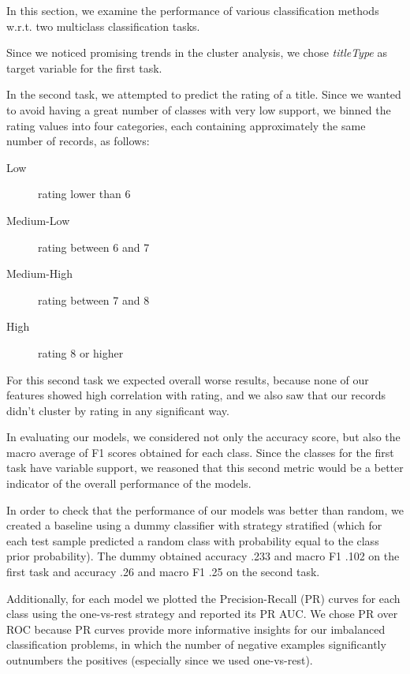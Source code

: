 In this section, we examine the performance of various classification methods w.r.t. two multiclass classification tasks.

Since we noticed promising trends in the cluster analysis, we chose \emph{titleType} as target variable for the first task.

In the second task, we attempted to predict the rating of a title.
Since we wanted to avoid having a great number of classes with very low support, we binned the rating values into four categories, each containing approximately the same number of records, as follows:
\begin{description}
    \item[Low] rating lower than 6
    \item[Medium-Low] rating between 6 and 7
    \item[Medium-High]  rating between 7 and 8
    \item[High] rating 8 or higher
\end{description}

For this second task we expected overall worse results, because none of our features showed high correlation with rating, and we also saw that our records didn't cluster by rating in any significant way.

In evaluating our models, we considered not only the accuracy score, but also the macro average of F1 scores obtained for each class.
Since the classes for the first task have variable support, we reasoned that this second metric would be a better indicator of the overall performance of the models.

In order to check that the performance of our models was better than random, we created a baseline using a dummy classifier with strategy stratified (which for each test sample predicted a random class with probability equal to the class prior probability).
The dummy obtained accuracy .233 and macro F1 .102 on the first task and accuracy .26 and macro F1 .25 on the second task.

Additionally, for each model we plotted the Precision-Recall (PR) curves for each class using the one-vs-rest strategy and reported its PR AUC. We chose PR over ROC because PR curves provide more informative insights for our imbalanced classification problems, in which the number of negative examples significantly outnumbers the positives (especially since we used one-vs-rest).


